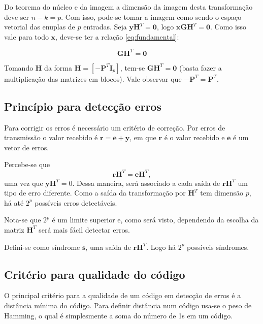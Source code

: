 Do teorema do núcleo e da imagem a dimensão da imagem desta transformação deve ser $n-k = p$. Com isso, pode-se tomar a imagem como sendo o espaço vetorial das enuplas de $p$ entradas. Seja $\textbf{y}\textbf{H}^T =\textbf{0}$, logo $\textbf{x}\textbf{G}\textbf{H}^T =\textbf{0}$. Como isso vale para todo $\textbf{x}$, deve-se ter a relação \ref{eq:fundamental}:

\begin{equation}
	\textbf{G}\textbf{H}^T =\textbf{0}
	\label{eq:fundamental}
\end{equation}

Tomando $\textbf{H}$ da forma $\textbf{H} = [-\textbf{P}^T\textbf{I}_p]$, tem-se $\textbf{G}\textbf{H}^T = \textbf{0}$ (basta fazer a multiplicação das matrizes em blocos). Vale observar que $-\textbf{P}^T = \textbf{P}^T$.

\subsection{Princípio para detecção erros}

Para corrigir os erros é necessário um critério de correção. Por erros de transmissão o valor recebido é $\textbf{r} = \textbf{e}+\textbf{y}$, em que $\textbf{r}$ é o valor recebido e $\textbf{e}$ é um vetor de erros. 

Percebe-se que 
\begin{equation}
    \textbf{r}\textbf{H}^T = \textbf{e}\textbf{H}^T,
    \label{eq:decoding}
\end{equation}
uma vez que $\textbf{y}\textbf{H}^T = 0$. Dessa maneira, será associado a cada saída de $\textbf{r}\textbf{H}^T$ um tipo de erro diferente. Como a saída da transformação por $\textbf{H}^T$ tem dimensão $p$, há até $2^p$ possíveis erros detectáveis.

Nota-se que $2^p$ é um limite superior e, como será visto, dependendo da escolha da matriz $\textbf{H}^T$ será mais fácil detectar erros.

Defini-se como síndrome $\textbf{s}$, uma saída de $\textbf{r}\textbf{H}^T$. Logo há $2^p$ possíveis síndromes.

\subsection{Critério para qualidade do código}

O principal critério para a qualidade de um código em detecção de erros é a distância mínima do código. Para definir distância num código usa-se o peso de Hamming, o qual é simplesmente a soma do número de 1s em um código.

